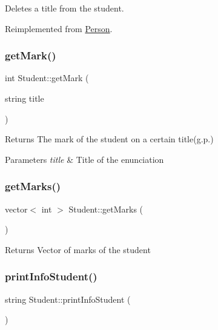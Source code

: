 Deletes a title from the student. 



Reimplemented from \hyperlink{class_person_a14f687637476ef033a3c9b865e67fd69}{Person}.

\mbox{\label{class_student_a05a0feee9294d3502af003fb65e56adf}} 
\subsubsection{\texorpdfstring{get\+Mark()}{getMark()}}
{\footnotesize\ttfamily int Student\+::get\+Mark (\begin{DoxyParamCaption}\item[{string}]{title }\end{DoxyParamCaption})}

\begin{DoxyReturn}{Returns}
The mark of the student on a certain title(g.\+p.) 
\end{DoxyReturn}

\begin{DoxyParams}{Parameters}
{\em title} & Title of the enunciation \\
\hline
\end{DoxyParams}
\mbox{\label{class_student_aff1ed57b8df6e9a3a43a32dc99923b34}} 
\subsubsection{\texorpdfstring{get\+Marks()}{getMarks()}}
{\footnotesize\ttfamily vector$<$ int $>$ Student\+::get\+Marks (\begin{DoxyParamCaption}{ }\end{DoxyParamCaption})}

\begin{DoxyReturn}{Returns}
Vector of marks of the student 
\end{DoxyReturn}
\mbox{\label{class_student_a4b566cc6bf1a725ca1569f306046b16b}} 
\subsubsection{\texorpdfstring{print\+Info\+Student()}{printInfoStudent()}}
{\footnotesize\ttfamily string Student\+::print\+Info\+Student (\begin{DoxyParamCaption}{ }\end{DoxyParamCaption})}

